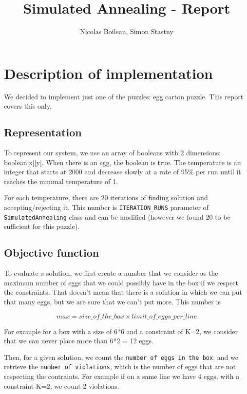 \documentclass{article}
\begin{document}
\providecommand{\abs}[1]{\lvert#1\rvert}

\title{Simulated Annealing - Report}
\author{Nicolas Boileau, Simon Stastny}

\maketitle

\section{Description of implementation}

We decided to implement just one of the puzzles: egg carton puzzle. This report
covers this only.

\subsection{Representation}

To represent our system, we use an array of booleans with 2
dimensions: boolean[x][y]. When there is an egg, the boolean is true. The
temperature is an integer that starts at 2000 and decrease slowly at a rate of
95\% per run until it reaches the minimal temperature of 1.

For each temperature, there are 20 iterations of finding solution and
accepting/rejecting it. This number is \texttt{ITERATION\_RUNS} parameter of
\texttt{SimulatedAnnealing} class and can be modified (however we found 20 to
be sufficient for this puzzle).

\subsection{Objective function}

To evaluate a solution, we first create a number that we consider as the
maximum number of eggs that we could possibly have in the box if we respect the
constraints. That doesn't mean that there is a solution in which we can put
that many eggs, but we are sure that we can't put more. This number is

\[
max = size\_of\_the\_box \times limit\_of\_eggs\_per\_line
\]

For example for a box with a size of 6*6 and a constraint of K=2, we consider
that we can never place more than 6*2 = 12 eggs.

Then, for a given solution, we count the \texttt{number of eggs in the box}, and
we retrieve the \texttt{number of violations}, which is the number of eggs that
are not respecting the contraints. For example if on a same line we have 4 eggs, with a
constraint K=2, we count 2 violations.
\end{document}
